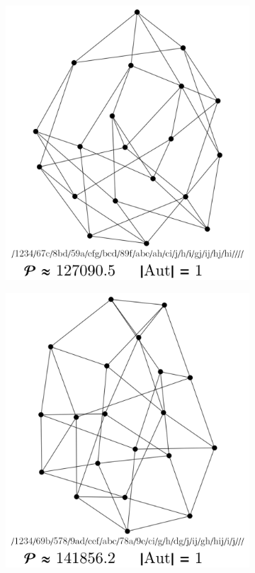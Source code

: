 \documentclass[11pt,a4paper]{article}
\renewcommand{\|}{\rule[-0.4ex]{0.2ex}{1.2em}}
\begin{document}
\begin{figure}[htb]
	\begin{subfigure}[b]{.24 \textwidth}
		\includegraphics[width=\linewidth]{smallest_18_1}
		\subcaption{}
	\end{subfigure}
	\begin{subfigure}[b]{.24 \textwidth}
		\includegraphics[width=\linewidth]{smallest_18_2}

\end{subfigure}
\end{figure}
\end{document}
